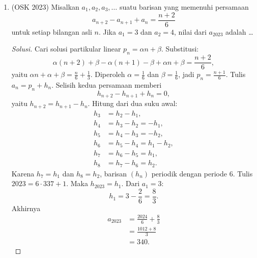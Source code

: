 \documentclass[12pt]{scrartcl}
\begin{document}
\begin{enumerate}[resume]
	\item (OSK 2023)
	Misalkan $a_{1},a_{2},a_{3},\dots$ suatu barisan yang memenuhi persamaan
	\[ a_{n+2}-a_{n+1}+a_{n}=\frac{n+2}{6} \]
	untuk setiap bilangan asli $n$. Jika $a_{1}=3$ dan $a_{2}=4$, nilai dari $a_{2023}$ adalah \dots
	\begin{proof}[Solusi]
	\renewcommand{\qedsymbol}{$\blacksquare$}
	Cari solusi partikular linear $p_n = \alpha n + \beta$. Substitusi:
	\[ \alpha(n+2) + \beta - \alpha(n+1) - \beta + \alpha n + \beta = \frac{n+2}{6}, \]
	yaitu $\alpha n + \alpha + \beta = \frac{n}{6} + \frac{1}{3}$.
	Diperoleh $\alpha = \frac16$ dan $\beta = \frac16$, jadi
	$p_n = \frac{n+1}{6}$.
	Tulis $a_n = p_n + h_n$. Selisih kedua persamaan memberi
	\[ h_{n+2} - h_{n+1} + h_n = 0, \]
	yaitu $h_{n+2} = h_{n+1} - h_n$. Hitung dari dua suku awal:
	\begin{align*}
	h_3 &= h_2 - h_1, \\
	h_4 &= h_3 - h_2 = -h_1, \\
	h_5 &= h_4 - h_3 = -h_2, \\
	h_6 &= h_5 - h_4 = h_1 - h_2, \\
	h_7 &= h_6 - h_5 = h_1, \\
	h_8 &= h_7 - h_6 = h_2.
	\end{align*}
	Karena $h_7 = h_1$ dan $h_8 = h_2$, barisan $(h_n)$ periodik
	dengan periode $6$. Tulis $2023 = 6 \cdot 337 + 1$. Maka
	$h_{2023} = h_1$. Dari $a_1 = 3$:
	\[ h_1 = 3 - \frac{2}{6} = \frac{8}{3}. \]
	Akhirnya
	\begin{align*}
	a_{2023} &= \frac{2024}{6} + \frac{8}{3} \\
	&= \frac{1012 + 8}{3} \\
	&= 340.
	\end{align*}
	\end{proof}

\end{enumerate}
\end{document}
